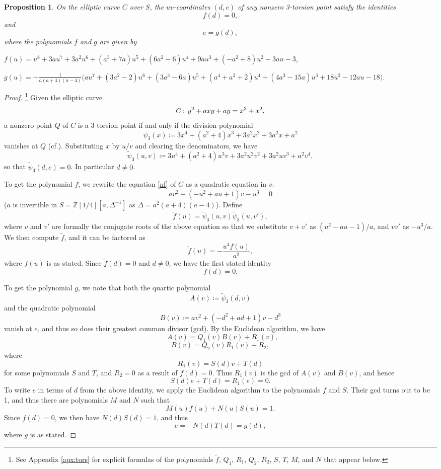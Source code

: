 \documentclass{gtpart}
\newtheorem{prop}[thm]{Proposition}
\theoremstyle{definition}
\theoremstyle{remark}
\def\co{\colon\thinspace}
\newcommand{\mb}[1]{\mathbb{#1}}
\newcommand{\cff}[2]{cf.\thinspace{\cite[#1]{#2}}}
\newcommand{\BZ}{{\mb Z}}
\newcommand{\Tf}{\widetilde{f}}
\newcommand{\TP}{\widetilde{\psi}}
\begin{document}
\begin{prop}
\label{prop:tors}
 On the elliptic curve $C$ over $S$, the $uv$-coordinates $(d,e)$ of any nonzero 3-torsion point satisfy the identities 
 \[
  f(d) = 0, 
 \]
 and 
 \[
  e = g(d), 
 \]
 where the polynomials $f$ and $g$ are given by 

 $f(u) = u^8 + 3 a u^7 + 3 a^2 u^6 + (a^3 + 7 a) u^5 + (6 a^2 - 6) u^4 + 9 a u^3 + (-a^2 + 8) u^2 - 3 a u - 3$, 

 $g(u) = -\frac{1}{a (a + 4) (a - 4)} \big(a u^7 + (3 a^2 - 2) u^6 + (3 a^3 - 6 a) u^5 + (a^4 + a^2 + 2) u^4 + (4 a^3 - 15 a) u^3 + 18 u^2 - 12 a u - 18\big)$.  
\end{prop}
\begin{proof}
 \footnote{See Appendix \ref{apx:tors} for explicit formulas of the polynomials $\Tf$, $Q_1$, $R_1$, $Q_2$, $R_2$, $S$, $T$, $M$, and $N$ that appear below.  }
 Given the elliptic curve 
 \[
  C \co y^2 + a x y + a y = x^3 + x^2, 
 \]
 a nonzero point $Q$ of $C$ is a 3-torsion point if and only if the division polynomial 
 \[
  \psi_3 (x) \coloneqq 3x^4 + (a^2 + 4) x^3 + 3a^2 x^2 + 3a^2 x + a^2 
 \]
 vanishes at $Q$ (\cff{Exercise 3.7f}{AEC}).  Substituting $x$ by $u/v$ and clearing the denominators, we have 
 \[
  \TP_3(u,v) \coloneqq 3u^4 + (a^2 + 4) u^3 v + 3a^2 u^2 v^2 + 3a^2 u v^3 + a^2 v^4, 
 \]
 so that $\TP_3(d,e) = 0$.  In particular $d \neq 0$.  

 To get the polynomial $f$, we rewrite the equation \eqref{nf} of $C$ as a quadratic equation in $v$: 
 \[
  a v^2 + (-u^2 + a u + 1) v - u^3 = 0 
 \]
 ($a$ is invertible in $S = \BZ [1/4] [a, \Delta^{-1}]$ as $\Delta = a^2 (a + 4) (a - 4)$).  
 Define 
 \[
  \Tf(u) = \TP_3(u,v) \TP_3(u,v'), 
 \]
 where $v$ and $v'$ are formally the conjugate roots of the 
 above equation so that we substitute $v + v'$ as $(u^2 - a u - 1) / a$, and $v v'$ as $-u^3 / a$.  We then compute $\Tf$, and it can be factored as 
 \[
  \Tf(u) = -\frac{u^4 f(u)}{a^2}, 
 \]
 where $f(u)$ is as stated.  
 Since $\Tf(d) = 0$ and $d \neq 0$, we have the first stated identity 
 \[
  f(d) = 0.  
 \]

 To get the polynomial $g$, we note that both the quartic polynomial 
 \[
  A(v) \coloneqq \TP_3(d,v) 
 \]
 and the quadratic polynomial 
 \[
  B(v) \coloneqq a v^2 + (-d^2 + a d + 1) v - d^3
 \]
 vanish at $e$, and thus so does their greatest common divisor (gcd).  By the Euclidean algorithm, we have 
 \[
  ~~~A(v) = Q_1(v) B(v) + R_1(v), 
 \]
 \[
  B(v) = Q_2(v) R_1(v) + R_2, 
 \]
 where 
 \[
  R_1(v) = S(d) v + T(d)
 \]
 for some polynomials $S$ and $T$, and $R_2 = 0$ as a result of $f(d) = 0$.  Thus $R_1(v)$ is the gcd of $A(v)$ and $B(v)$, and hence 
 \[
  S(d) e + T(d) = R_1(e) = 0.  
 \]
 To write $e$ in terms of $d$ from the above identity, we apply the Euclidean algorithm to the polynomials $f$ and $S$.  
 Their gcd turns out to be 1, and thus there are polynomials $M$ and $N$ such that 
 \[
  M(u) f(u) + N(u) S(u) = 1.  
 \]
 Since $f(d) = 0$, we then have $N(d) S(d) = 1$, and thus 
 \[
  e = -N(d) T(d) = g(d), 
 \]
 where $g$ is as stated.  
\end{proof}
\end{document}
